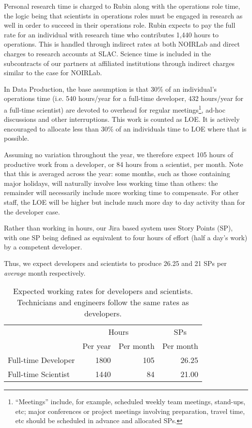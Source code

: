 Personal research time is charged to Rubin along with the operations role time, the logic being that 
scientists in operations roles must be engaged in research as well in order to succeed in their operations role.
Rubin expects to pay the full rate for an individual with research time who contributes 1,440 hours to
operations. 
This is handled through indirect rates at both NOIRLab and direct charges to research accounts at SLAC. 
Science time is included in the subcontracts of our partners at affiliated institutions through indirect charges 
similar to the case for NOIRLab.

In Data Production, the base assumption is that 30\% of an individual's \RO operations time (i.e. 540 hours/year for a full-time developer, 432 hours/year for a full-time scientist) are devoted to 
overhead for regular meetings\footnote{``Meetings'' include, for example, scheduled weekly team meetings, stand-ups, etc; 
major conferences or project meetings involving preparation, travel time, etc should be scheduled in advance and allocated \glspl{SP}.}, 
ad-hoc discussions and other interruptions.
This work is counted as \gls{LOE}.
It is actively encouraged to allocate less than 30\% of an individuals time to \gls{LOE} where that is possible.

Assuming no variation throughout the year, we therefore expect 105 hours of productive work from a developer, or 84 hours from a scientist, per month.
Note that this is averaged across the year: some months, such as those containing major holidays, will naturally involve less working time than others: the remainder will necessarily include more working time to compensate. For other staff, the \gls{LOE} will be higher but include much more day to day activity than for the developer case.

Rather than working in hours, our Jira based system uses Story Points (\gls{SP}), with one \gls{SP} being defined as equivalent to four hours of effort (half a day's work) by a competent developer.

Thus, we expect developers and scientists to produce 26.25 and 21 \glspl{SP} per \emph{average} month respectively.

\begin{table}
\begin{longtable}[]{@{}lrrr@{}}
\hline
          & \multicolumn{2}{c}{Hours} & \multicolumn{1}{c}{\glspl{SP}} \\
          & Per year & Per month      & Per month \\
\hline
Full-time Developer & 1800     & 105            & 26.25 \\
Full-time Scientist & 1440     &  84            & 21.00 \\
\hline
\end{longtable}
\caption{Expected working rates for developers and scientists. Technicians and engineers follow the same rates as developers.}
\label{tab:working-rate}
\end{table}

